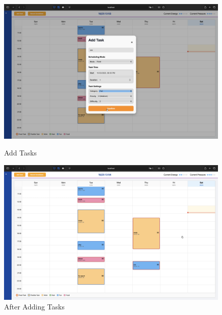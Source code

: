 \documentclass[12pt, a4paper]{article}
\begin{document}
\begin{enumerate}
                    \begin{figure}[H]
                        \begin{minipage}[t]{0.49\textwidth}
                            \centering
                            \includegraphics[width=\textwidth]{Images/System/timetable/add.png}
                            \caption{Add Tasks}
                            \label{add}
                        \end{minipage}
                        \hfill
                        \begin{minipage}[t]{0.49\textwidth}
                            \centering
                            \includegraphics[width=\textwidth]{Images/System/timetable/aft_add.png}
                            \caption{After Adding Tasks}
                            \label{After Adding}
                        \end{minipage}
                    \end{figure}


\end{enumerate}
\end{document}
